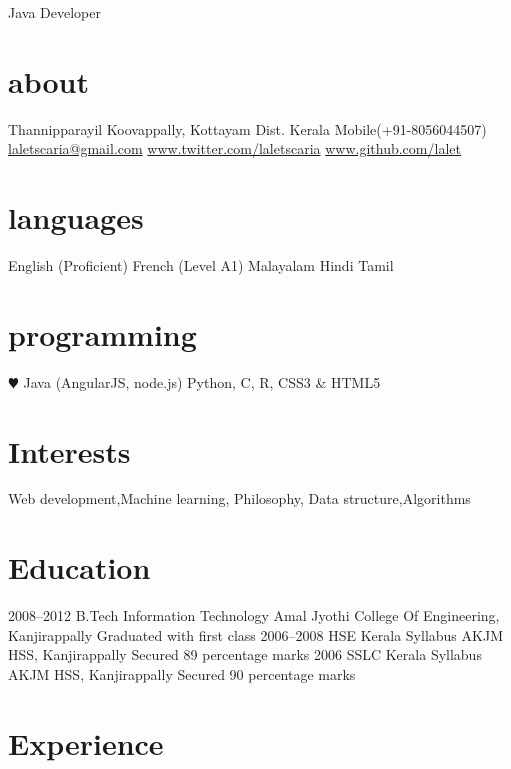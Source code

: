 \documentclass[]{lalet-cv}
\begin{document}
       {Java Developer}


\begin{aside}
  \section{about}
    Thannipparayil
    Koovappally,
    Kottayam Dist.
    Kerala
    Mobile(+91-8056044507)
    ~
    \href{mailto:laletscaria@gmail.com}{laletscaria@gmail.com}			
    \href{www.twitter.com/laletscaria}{www.twitter.com/laletscaria}
    \href{www.github.com/lalet}{www.github.com/lalet}
  \section{languages}
    English (Proficient)
    French (Level A1)
    Malayalam
    Hindi
    Tamil
  \section{programming}
    {\color{red} $\varheartsuit$} Java
    (AngularJS, node.js)
    Python, C, R,
    CSS3 \& HTML5
\end{aside}

\section{Interests}

Web development,Machine learning, Philosophy,
Data structure,Algorithms

\section{Education}

\begin{entrylist}
  \entry
    {2008–2012}
    {B.Tech Information Technology}
    {Amal Jyothi College Of Engineering, Kanjirappally}
    {Graduated with first class}
  \entry
    {2006–2008}
    {HSE Kerala Syllabus}
    {AKJM HSS, Kanjirappally}
    {Secured 89 percentage marks}
  \entry
    {2006}
    {SSLC Kerala Syllabus}
    {AKJM HSS, Kanjirappally}
    {Secured 90 percentage marks}
\end{entrylist}

\section{Experience}
\end{document}
